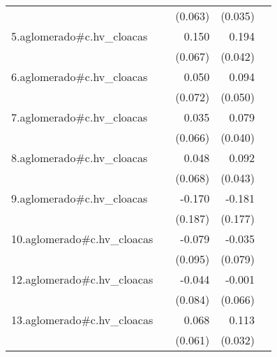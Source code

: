 {\begin{longtable}{l*{4}{D{.}{.}{-1}}}
            &                     &     (0.063)         &     (0.035)         &                     \\
\addlinespace
5.aglomerado#c.hv\_cloacas&                     &       0.150\sym{*}  &       0.194\sym{***}&                     \\
            &                     &     (0.067)         &     (0.042)         &                     \\
\addlinespace
6.aglomerado#c.hv\_cloacas&                     &       0.050         &       0.094         &                     \\
            &                     &     (0.072)         &     (0.050)         &                     \\
\addlinespace
7.aglomerado#c.hv\_cloacas&                     &       0.035         &       0.079\sym{*}  &                     \\
            &                     &     (0.066)         &     (0.040)         &                     \\
\addlinespace
8.aglomerado#c.hv\_cloacas&                     &       0.048         &       0.092\sym{*}  &                     \\
            &                     &     (0.068)         &     (0.043)         &                     \\
\addlinespace
9.aglomerado#c.hv\_cloacas&                     &      -0.170         &      -0.181         &                     \\
            &                     &     (0.187)         &     (0.177)         &                     \\
\addlinespace
10.aglomerado#c.hv\_cloacas&                     &      -0.079         &      -0.035         &                     \\
            &                     &     (0.095)         &     (0.079)         &                     \\
\addlinespace
12.aglomerado#c.hv\_cloacas&                     &      -0.044         &      -0.001         &                     \\
            &                     &     (0.084)         &     (0.066)         &                     \\
\addlinespace
13.aglomerado#c.hv\_cloacas&                     &       0.068         &       0.113\sym{***}&                     \\
            &                     &     (0.061)         &     (0.032)         &                     \\

\end{longtable}}
